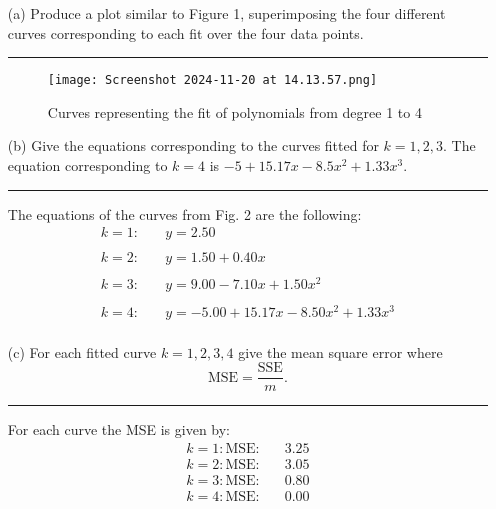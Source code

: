 \documentclass{article}
\begin{document}
\begin{enumerate}
    \item[(a)] Produce a plot similar to Figure 1, superimposing the four different curves corresponding to each fit over the four data points.

    \noindent\textcolor{gray}{\rule{0.1\linewidth}{0.5pt}}
    
    \vspace{20pt}
    
    \begin{figure}[H]
        \centering
        \texttt{[image: Screenshot 2024-11-20 at 14.13.57.png]}
        \caption{Curves representing the fit of polynomials from degree 1 to 4}
        \label{fig:enter-label}
    \end{figure}

    \vspace{25pt}
    
    \item[(b)] Give the equations corresponding to the curves fitted for \(k = 1, 2, 3\). The equation corresponding to \(k = 4\) is 
    \(-5 + 15.17x - 8.5x^2 + 1.33x^3.\)

    \noindent\textcolor{gray}{\rule{0.1\linewidth}{0.5pt}}


    The equations of the curves from Fig. 2 are the following:
    \begin{align*}
    k=1: \quad & y = 2.50 \\
    \\
    k=2: \quad & y = 1.50 + 0.40x \\
    \\
    k=3: \quad & y = 9.00 - 7.10x + 1.50x^2 \\
    \\
    k=4: \quad & y = -5.00 + 15.17x - 8.50x^2 + 1.33x^3 \\
    \end{align*}
    
    \item[(c)] For each fitted curve \(k = 1, 2, 3, 4\) give the mean square error where 
    \[
    \text{MSE} = \frac{\text{SSE}}{m}.
    \]

    \noindent\textcolor{gray}{\rule{0.1\linewidth}{0.5pt}}


    For each curve the MSE is given by:
    \begin{align*}
        k=1: \text{MSE:} \quad & 3.25 \\
        k=2: \text{MSE:} \quad & 3.05 \\
        k=3: \text{MSE:} \quad & 0.80 \\
        k=4: \text{MSE:} \quad & 0.00 \\
    \end{align*}    
\end{enumerate}
\end{document}
